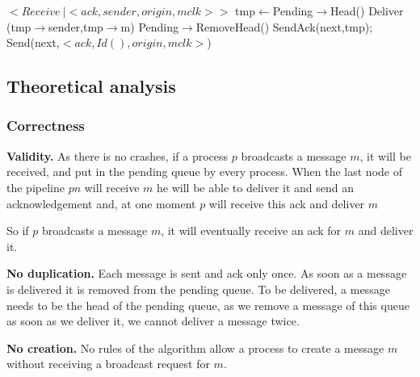 \documentclass[a4paper]{article}
\begin{document}
\begin{algorithm}[H]
    \centering
    \begin{algorithmic}[5]
        \Event $<Receive\  | <ack,sender,origin, mclk>>$
        \State tmp$\gets$Pending$\rightarrow$Head()
        \State Deliver (tmp$\rightarrow$sender,tmp$\rightarrow$m)
        \State Pending$\rightarrow$RemoveHead()
        \EndWhile
        \State SendAck(next,tmp);
        \EndIf
        \Else
        \State Send(next,$<ack,Id(),origin,mclk>$)
        \EndIf
        \EndIf
        \EndEvent
    \end{algorithmic}
\end{algorithm}


\subsection{Theoretical analysis}
\subsubsection{Correctness}
\label{sec:pipelineack-proof}
\noindent\textbf{Validity.} As there is no crashes, if a process $p$
broadcasts a message $m$, it will be received, and put in the pending queue by
every process. When the last node of the pipeline $pn$ will receive $m$ he
will be able to deliver it and send an acknowledgement and, at one moment $p$
will receive this ack and deliver $m$

So if $p$ broadcasts a message $m$, it will eventually receive an ack for $m$
and deliver it.

\bigskip
\noindent\textbf{No duplication.} Each message is sent and ack only once. As
soon as a message is delivered it is removed from the pending queue. To be
delivered, a message needs to be the head of the pending queue, as we remove a
message of this queue as soon as we deliver it, we cannot deliver a message
twice.

\bigskip
\noindent\textbf{No creation.} No rules of the algorithm allow a process to
create a message $m$ without receiving a broadcast request for $m$.
\end{document}
